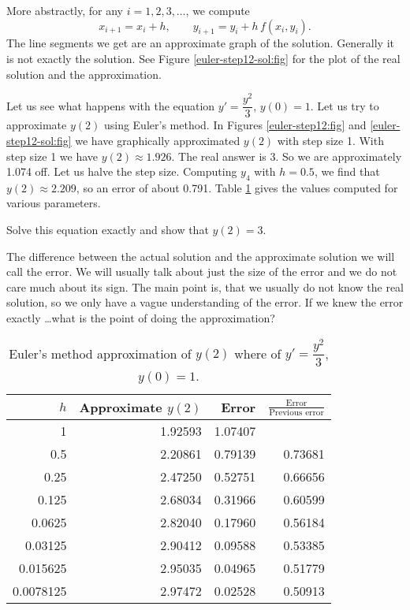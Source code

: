 More abstractly, for any $i=1,2,3,\ldots$, we compute
\begin{equation*}
x_{i+1} = x_i + h , \qquad y_{i+1}  = y_i + h\, f(x_i,y_i) .
\end{equation*}
The line segments we get are an
approximate graph of the solution.
Generally it is not exactly the solution.  See Figure
\ref{euler-step12-sol:fig} for the plot of the real solution
and the approximation.



Let us see what happens with the equation $y' = \dfrac{y^2}{3}$, $y(0)=1$.
Let us try
to approximate $y(2)$ using Euler's method.  In
Figures \ref{euler-step12:fig}
and \ref{euler-step12-sol:fig} we have 
graphically approximated $y(2)$ with step size 1.  With step
size 1 we have $y(2) \approx 1.926$.  The real
answer is 3.  So we are approximately 1.074
off.  Let us halve the step size.  Computing $y_4$ with $h=0.5$,
we find that $y(2) \approx 2.209$, so an error of about 0.791.
Table \ref{euler-table:table} gives the values computed
for various parameters.

\medskip

 Solve this equation exactly and show that $y(2) = 3$.

\medskip

The difference between the actual solution and the approximate solution we
will call the error.  We will usually talk about just the size of the error
and we do not care much about its sign.  The main point is, that we usually
do not know the real solution, so we only have a vague understanding of the
error.  If we knew the error exactly \ldots what is the point of doing the
approximation?

\begin{table}[h!t]
\begin{center}
\begin{tabular}{@{}rrrr@{}}
\hline
$h$ & Approximate $y(2)$ & Error & $\frac{\text{Error}}{\text{Previous
error}}$ \\
\hline
1        & 1.92593 & 1.07407 & \\
0.5      & 2.20861 & 0.79139 & 0.73681 \\
0.25     & 2.47250 & 0.52751 & 0.66656 \\
0.125    & 2.68034 & 0.31966 & 0.60599 \\
0.0625   & 2.82040 & 0.17960 & 0.56184 \\
0.03125  & 2.90412 & 0.09588 & 0.53385 \\
0.015625 & 2.95035 & 0.04965 & 0.51779 \\
0.0078125& 2.97472 & 0.02528 & 0.50913 \\
\hline
\end{tabular}
\end{center}
\caption{Euler's method approximation of $y(2)$ where
of $y'=\dfrac{y^2}{3}$, $y(0)=1$.\label{euler-table:table}}
\end{table}


